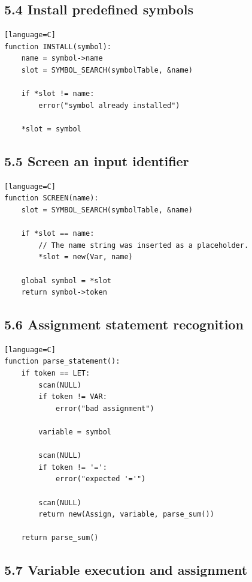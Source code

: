 \documentclass[11pt]{article}
\begin{document}
\subsection{5.4 Install predefined
symbols}\label{install-predefined-symbols}

\begin{verbatim}[language=C]
function INSTALL(symbol):
    name = symbol->name
    slot = SYMBOL_SEARCH(symbolTable, &name)

    if *slot != name:
        error("symbol already installed")

    *slot = symbol
\end{verbatim}

\subsection{5.5 Screen an input
identifier}\label{screen-an-input-identifier}

\begin{verbatim}[language=C]
function SCREEN(name):
    slot = SYMBOL_SEARCH(symbolTable, &name)

    if *slot == name:
        // The name string was inserted as a placeholder.
        *slot = new(Var, name)

    global symbol = *slot
    return symbol->token
\end{verbatim}

\subsection{5.6 Assignment statement
recognition}\label{assignment-statement-recognition}

\begin{verbatim}[language=C]
function parse_statement():
    if token == LET:
        scan(NULL)
        if token != VAR:
            error("bad assignment")

        variable = symbol

        scan(NULL)
        if token != '=':
            error("expected '='")

        scan(NULL)
        return new(Assign, variable, parse_sum())

    return parse_sum()
\end{verbatim}

\subsection{5.7 Variable execution and
assignment}\label{variable-execution-and-assignment}
\end{document}
